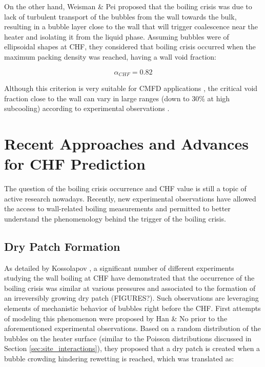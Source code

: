 \npar

On the other hand, Weisman \& Pei \cite{weisman_pei} proposed that the boiling crisis was due to lack of turbulent transport of the bubbles from the wall towards the bulk, resulting in a bubble layer close to the wall that will trigger coalescence near the heater and isolating it from the liquid phase. Assuming bubbles were of ellipsoidal shapes at CHF, they considered that boiling crisis occurred when the maximum packing density was reached, \ie having a wall void fraction:

\begin{equation}
\alpha_{CHF} = 0.82
\end{equation} 

Although this criterion is very suitable for CMFD applications \cite{mimouni_chf, cmfd_chf}, the critical void fraction close to the wall can vary in large ranges (down to 30\% at high subcooling) according to experimental observations \cite{bruder}.


\section{Recent Approaches and Advances for CHF Prediction}



The question of the boiling crisis occurrence and CHF value is still a topic of active research nowadays. Recently, new experimental observations have allowed the access to wall-related boiling measurements \cite{kossolapov_experimental_2021} \cite{richenderfer_experimental_2018} \cite{bloch_study_2016} and permitted to better understand the phenomenology behind the trigger of the boiling crisis.

\npar

\subsection{Dry Patch Formation}

As detailed by Kossolapov \cite{kossolapov_experimental_2021}, a significant number of different experiments studying the wall boiling at CHF have demonstrated that the occurrence of the boiling crisis was similar at various pressures and associated to the formation of an irreversibly growing dry patch \cite{AAA} (FIGURES?). Such observations are leveraging elements of mechanistic behavior of bubbles right before the CHF. First attempts of modeling this phenomenon were proposed by Han \& No \cite{han_no} prior to the aforementioned experimental observations. Based on a random distribution of the bubbles on the heater surface (similar to the Poisson distributions discussed in Section \ref{sec:site_interactions}), they proposed that a dry patch is created when a bubble crowding hindering rewetting is reached, which was translated as:

